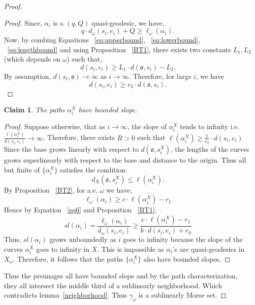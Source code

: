 \documentclass[12 pt]{amsart}
\newcommand{\gothic}{\mathfrak}
\newcommand{\go}{{\gothic o}}
\newtheorem{claim}[theorem]{Claim}
\theoremstyle{definition}
\theoremstyle{remark}
\begin{document}
\begin{proof}
\begin{proof}
Since, $\alpha_i$ is a $(q,Q)$ quasi-geodesic, we have,
\begin{equation} \label{eq:lengthbound}
 q \cdot d_\omega(s_i,e_i)+Q \ge \ell_\omega(\alpha_i).   
\end{equation}
Now, by combing Equations ~\ref{eq:upperbound}, ~\ref{eq:lowerbound}, ~\ref{eq:lengthbound} and using Proposition ~\ref{BT1}, there exists two constants $L_1,L_2$ (which depends on $\omega$) such that, \[d(s_i,e_i) \ge L_1 \cdot d(\go,s_i)-L_2.\]
By assumption, $d(s_i,\go) \rightarrow \infty$ as $i \rightarrow\infty.$ Therefore, for large $i$, we have \[d(s_i,e_i) \ge c_3\cdot d(\go,s_i).\]
    

\end{proof}


\begin{claim} \label{39}
The paths $\alpha^X_i$ have bounded slope.
\end{claim}
\begin{proof}
Suppose otherwise, that as $i \to \infty$, the slope of $\alpha^X_i$ tends to infinity i.e. $\frac{\ell(\alpha_i^X)}{d(s_i,e_i)} \rightarrow \infty$. Therefore, there exists $R> 0$ such that $\ell(\alpha_i^X) \ge \frac{1}{c_3}\cdot d(s_i,e_i)$   Since the base grows linearly with respect to $d(\go, s^X_i)$, the lengths of the curves grows superlinearly with respect to the base and distance to the origin. Thus all but finite of $\{ \alpha^X_i \} $ satisfies the condition:
\[ d_X(\go, s^X_i) \leq \ell(\alpha^X_i).\]
By Proposition ~\ref{BT2}, for a.e. $\omega$ we have,
\begin{equation} \label{eq6}
 \ell_\omega(\alpha_i) \ge c \cdot \ell(\alpha_i^X) -r_1
\end{equation}
Hence by Equation ~\ref{eq6} and Proposition ~\ref{BT1}, \[sl(\alpha_i) = \frac{\ell_\omega(\alpha_i)}{d_\omega(s_i,e_i)} \geq \frac{ c \cdot \ell(\alpha_i^X) -r_1}{b \cdot d(s_i,e_i)+r_0} \]
Thus, $sl(\alpha_i)$ grows unboundedly as $i$ goes to infinity because the slope of the curves $\alpha_i^X$ goes to infinity in $X$. This is impossible as $\alpha_i$'s are quasi-geodesics in $X_\omega$. Therefore, it follows that the paths $\{\alpha^X_i\}$ also have bounded slopes.
\end{proof}
Thus the preimages all have bounded slope and by the path characterization, 
they all intersect the middle third of a sublinearly neighborhood. Which contradicts lemma~\ref{neighborhood}. Thus $\gamma_\omega$ is a sublinearly Morse set.
\end{proof}
\end{document}
